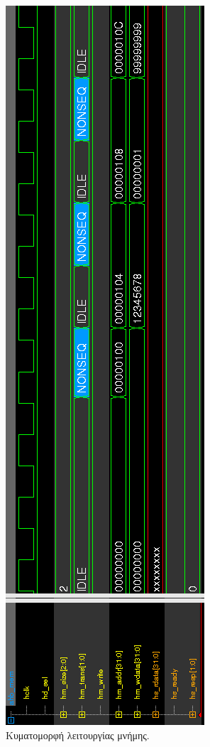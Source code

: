 \documentclass[a4paper,10pt]{article}
\numberwithin{figure}{section}
\numberwithin{table}{section}
\begin{document}
\begin{figure}[h!]
 \centering
 \includegraphics[bb=0 0 280 1012,scale=0.45]{./Images/waves_mem.png}
 \caption{Κυματομορφή λειτουργίας μνήμης.}
\end{figure}
\end{document}
